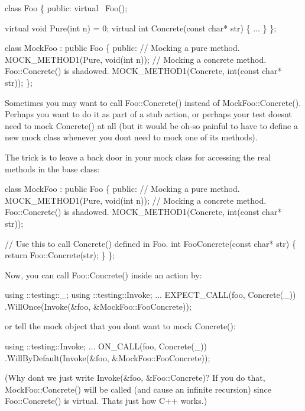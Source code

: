 \begin{DoxyCode}
class Foo \{
 public:
  virtual ~Foo();

  virtual void Pure(int n) = 0;
  virtual int Concrete(const char* str) \{ ... \}
\};

class MockFoo : public Foo \{
 public:
  // Mocking a pure method.
  MOCK\_METHOD1(Pure, void(int n));
  // Mocking a concrete method.  Foo::Concrete() is shadowed.
  MOCK\_METHOD1(Concrete, int(const char* str));
\};
\end{DoxyCode}


Sometimes you may want to call {\ttfamily Foo\+::\+Concrete()} instead of {\ttfamily Mock\+Foo\+::\+Concrete()}. Perhaps you want to do it as part of a stub action, or perhaps your test doesn\textquotesingle{}t need to mock {\ttfamily Concrete()} at all (but it would be oh-\/so painful to have to define a new mock class whenever you don\textquotesingle{}t need to mock one of its methods).

The trick is to leave a back door in your mock class for accessing the real methods in the base class\+:


\begin{DoxyCode}
class MockFoo : public Foo \{
 public:
  // Mocking a pure method.
  MOCK\_METHOD1(Pure, void(int n));
  // Mocking a concrete method.  Foo::Concrete() is shadowed.
  MOCK\_METHOD1(Concrete, int(const char* str));

  // Use this to call Concrete() defined in Foo.
  int FooConcrete(const char* str) \{ return Foo::Concrete(str); \}
\};
\end{DoxyCode}


Now, you can call {\ttfamily Foo\+::\+Concrete()} inside an action by\+:


\begin{DoxyCode}
using ::testing::\_;
using ::testing::Invoke;
...
  EXPECT\_CALL(foo, Concrete(\_))
      .WillOnce(Invoke(&foo, &MockFoo::FooConcrete));
\end{DoxyCode}


or tell the mock object that you don\textquotesingle{}t want to mock {\ttfamily Concrete()}\+:


\begin{DoxyCode}
using ::testing::Invoke;
...
  ON\_CALL(foo, Concrete(\_))
      .WillByDefault(Invoke(&foo, &MockFoo::FooConcrete));
\end{DoxyCode}


(Why don\textquotesingle{}t we just write {\ttfamily Invoke(\&foo, \&\+Foo\+::\+Concrete)}? If you do that, {\ttfamily Mock\+Foo\+::\+Concrete()} will be called (and cause an infinite recursion) since {\ttfamily Foo\+::\+Concrete()} is virtual. That\textquotesingle{}s just how C++ works.)

